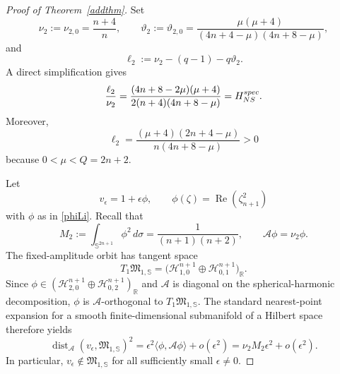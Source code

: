 \documentclass[10pt,a4paper]{amsart}
\begin{document}
\begin{proof}
[Proof of Theorem~\ref{addthm}]
Set
\[
 \nu_2:=\nu_{2,0}=\frac{n+4}{n},
 \qquad
 \vartheta_2:=\vartheta_{2,0}
 =\frac{\mu(\mu+4)}{(4n+4-\mu)(4n+8-\mu)},
\]
and
\begin{equation}\label{CP-ell2}
 \ell_2:=\nu_2-(q-1)-q\vartheta_2.
\end{equation}
A direct simplification gives
\begin{equation}\label{CP-kappa}
 \frac{\ell_2}{\nu_2}
 =\frac{(4n+8-2\mu)(\mu+4)}{2(n+4)(4n+8-\mu)}
 =H_{NS}^{\rm spec}.
\end{equation}
Moreover,
\[
 \ell_2=\frac{(\mu+4)(2n+4-\mu)}{n(4n+8-\mu)}>0
\]
because $0<\mu<Q=2n+2$.

Let
\[
 v_\epsilon=1+\epsilon\phi,
 \qquad
 \phi(\zeta)=\operatorname{Re}(\zeta_{n+1}^2)
\]
with $\phi$ as in \eqref{phiLi}. Recall that
\begin{equation}\label{CP-M2}
 M_2:=\int_{\mathbb S^{2n+1}}\phi^2\,d\sigma
 =\frac{1}{(n+1)(n+2)},
 \qquad
 \mathscr A\phi=\nu_2\phi.
\end{equation}
The fixed-amplitude orbit has tangent space
\[
 T_1\mathfrak M_{1,\mathbb S}
 =\big(\mathcal H_{1,0}^{n+1}\oplus\mathcal H_{0,1}^{n+1}\big)_{\mathbb R}.
\]
Since $\phi\in(\mathcal H_{2,0}^{n+1}\oplus\mathcal H_{0,2}^{n+1})_{\mathbb R}$ and $\mathscr A$ is diagonal on the spherical-harmonic decomposition, $\phi$ is $\mathscr A$-orthogonal to $T_1\mathfrak M_{1,\mathbb S}$. The standard nearest-point expansion for a smooth finite-dimensional submanifold of a Hilbert space therefore yields
\begin{equation}\label{CP-distance}
 \operatorname{dist}_{\mathscr A}(v_\epsilon,\mathfrak M_{1,\mathbb S})^2
 =\epsilon^2\langle\phi,\mathscr A\phi\rangle+o(\epsilon^2)
 =\nu_2M_2\epsilon^2+o(\epsilon^2).
\end{equation}
In particular, $v_\epsilon\notin\mathfrak M_{1,\mathbb S}$ for all sufficiently small $\epsilon\ne0$.


\end{proof}
\end{document}
